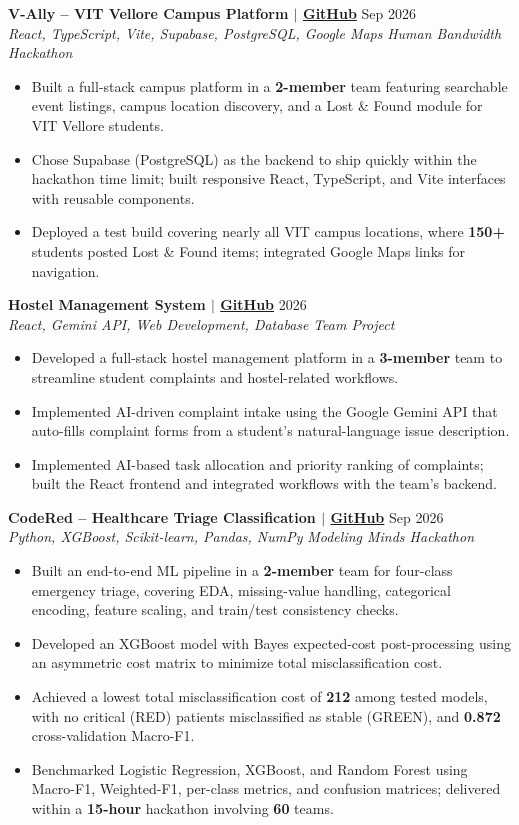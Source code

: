 \documentclass[10pt,letterpaper]{article}
\newcommand{\entry}[4]{%
  \textbf{#1} \hfill #2 \\
  \textit{#3} \hfill \textit{#4}\\[-1pt]
}
\begin{document}
\entry{V-Ally -- VIT Vellore Campus Platform {\normalfont\small $|$ \href{https://github.com/sudeep-codes/V-Ally}{GitHub}}}{Sep 2026}{React, TypeScript, Vite, Supabase, PostgreSQL, Google Maps}{Human Bandwidth Hackathon}
\begin{itemize}
  \item Built a full-stack campus platform in a \textbf{2-member} team featuring searchable event listings, campus location discovery, and a Lost \& Found module for VIT Vellore students.
  \item Chose Supabase (PostgreSQL) as the backend to ship quickly within the hackathon time limit; built responsive React, TypeScript, and Vite interfaces with reusable components.
  \item Deployed a test build covering nearly all VIT campus locations, where \textbf{150+} students posted Lost \& Found items; integrated Google Maps links for navigation.
\end{itemize}

\vspace{3pt}
\entry{Hostel Management System {\normalfont\small $|$ \href{https://github.com/CodeClosed/FIX_MASTER}{GitHub}}}{2026}{React, Gemini API, Web Development, Database}{Team Project}
\begin{itemize}
  \item Developed a full-stack hostel management platform in a \textbf{3-member} team to streamline student complaints and hostel-related workflows.
  \item Implemented AI-driven complaint intake using the Google Gemini API that auto-fills complaint forms from a student's natural-language issue description.
  \item Implemented AI-based task allocation and priority ranking of complaints; built the React frontend and integrated workflows with the team's backend.
\end{itemize}

\vspace{3pt}
\entry{CodeRed -- Healthcare Triage Classification {\normalfont\small $|$ \href{https://github.com/sudeep-codes/CodeRed}{GitHub}}}{Sep 2026}{Python, XGBoost, Scikit-learn, Pandas, NumPy}{Modeling Minds Hackathon}
\begin{itemize}
  \item Built an end-to-end ML pipeline in a \textbf{2-member} team for four-class emergency triage, covering EDA, missing-value handling, categorical encoding, feature scaling, and train/test consistency checks.
  \item Developed an XGBoost model with Bayes expected-cost post-processing using an asymmetric cost matrix to minimize total misclassification cost.
  \item Achieved a lowest total misclassification cost of \textbf{212} among tested models, with no critical (RED) patients misclassified as stable (GREEN), and \textbf{0.872} cross-validation Macro-F1.
  \item Benchmarked Logistic Regression, XGBoost, and Random Forest using Macro-F1, Weighted-F1, per-class metrics, and confusion matrices; delivered within a \textbf{15-hour} hackathon involving \textbf{60} teams.
\end{itemize}
\end{document}
